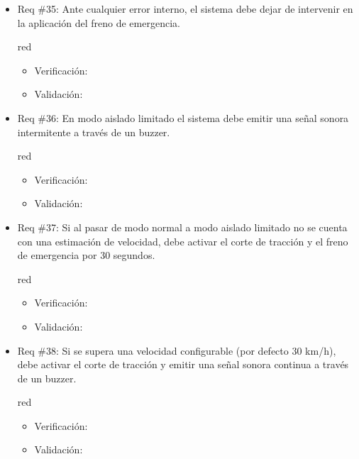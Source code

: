 \documentclass[11pt]{charter}
\begin{document}
\begin{itemize}
\item Req \#35: Ante cualquier error interno, el sistema debe dejar de intervenir en la aplicación del freno de emergencia.
\begin{consigna}{red}
\begin{itemize}
  \item Verificación:\\
  \item Validación:\\
\end{itemize}
\end{consigna}

\item Req \#36: En modo aislado limitado el sistema debe emitir una señal sonora intermitente a través de un buzzer.
\begin{consigna}{red}
\begin{itemize}
  \item Verificación:\\
  \item Validación:\\
\end{itemize}
\end{consigna}

\item Req \#37: Si al pasar de modo normal a modo aislado limitado no se cuenta con una estimación de velocidad, debe activar el corte de tracción y el freno de emergencia por 30 segundos.
\begin{consigna}{red}
\begin{itemize}
  \item Verificación:\\
  \item Validación:\\
\end{itemize}
\end{consigna}

\item Req \#38: Si se supera una velocidad configurable (por defecto 30 km/h), debe activar el corte de tracción y emitir una señal sonora continua a través de un buzzer.
\begin{consigna}{red}
\begin{itemize}
  \item Verificación:\\
  \item Validación:\\
\end{itemize}
\end{consigna}


\end{itemize}
\end{document}
